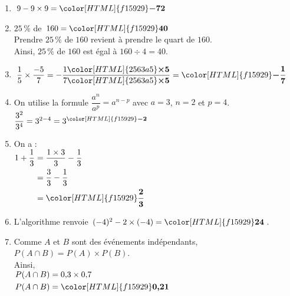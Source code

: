 \documentclass[a4paper,11pt,landscape,exos]{nsi} %
\begin{document}
\begin{multicols}{2}
\maketitle

\begin{enumerate}[]
\item $9-9\times9={\color[HTML]{f15929}\boldsymbol{-72}}$
\item $25\,\%$ de $160 = {\color[HTML]{f15929}\boldsymbol{40}}$\\ Prendre $25\,\%$  de $160$ revient à prendre le quart de $160$.\\
      Ainsi, $25\,\%$ de $160$ est égal à $160\div 4 =40$.
     
\item $\dfrac{1}{5}\times \dfrac{-5}{7}=-\dfrac{1{\color[HTML]{2563a5}\boldsymbol{\times5}} }{7{\color[HTML]{2563a5}\boldsymbol{\times5}}}={\color[HTML]{f15929}\boldsymbol{-\dfrac{1}{7}}}$
\item On utilise la formule $\dfrac{a^n}{a^p}=a^{n - p}$
        avec $a=3$,  $n=2$ et $p=4$.\\
        $\dfrac{3^{2}}{3^{4}}=3^{2-4}=3^{{\color[HTML]{f15929}\boldsymbol{-2}}}$
\item On a : \\$\begin{aligned}
      1+\dfrac{1}{3} &= \dfrac{1 \times 3}{3} - \dfrac{1}{3} \\
      &= \dfrac{3}{3} - \dfrac{1}{3}\\
      &  ={\color[HTML]{f15929}\boldsymbol{\dfrac{2}{3}}}
      \end{aligned}$
\item  L'algorithme renvoie $(-4)^2-2\times(-4)={\color[HTML]{f15929}\boldsymbol{24}}$.
\item  Comme $A$ et $B$ sont des événements indépendants,  $P(A\cap B)=P(A)\times  P(B)$.\\
Ainsi, \\
$\begin{aligned}
P(A\cap B)&=0{,}3 \times 0{,}7\\
P(A\cap B)&={\color[HTML]{f15929}\boldsymbol{0{,}21}}
\end{aligned}$
  

\end{enumerate}
\end{multicols}
\end{document}
